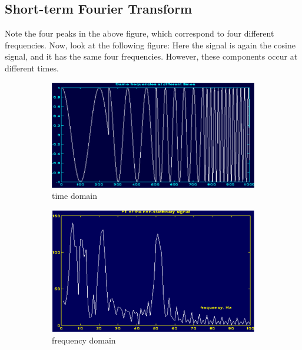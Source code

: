 \documentclass[12pt, a4paper, twoside]{report}
\begin{document}
\subsection{Short-term Fourier Transform}
Note the four peaks in the above figure, which correspond to four different frequencies. Now, look at the following figure: Here the signal is again the cosine signal, and it has the same four frequencies. However, these components occur at different times.
\begin{figure}[H]
    \centering
    \begin{subfigure}[b]{0.7\textwidth}
        \includegraphics[width=\textwidth]
        {images/chapter3/ft-fail-signal-time}
        \caption{time domain}
        \label{fig:ft-fail-signal-time}
    \end{subfigure}

    \begin{subfigure}[b]{0.7\textwidth}
        \includegraphics[width=\textwidth]
        {images/chapter3/ft-fail-signal-freq}
        \caption{frequency domain}
        \label{fig:ft-fail-signal-freq}
    \end{subfigure}
    \caption{}
    \label{fig:ft-fail-signal}
\end{figure}
\end{document}

